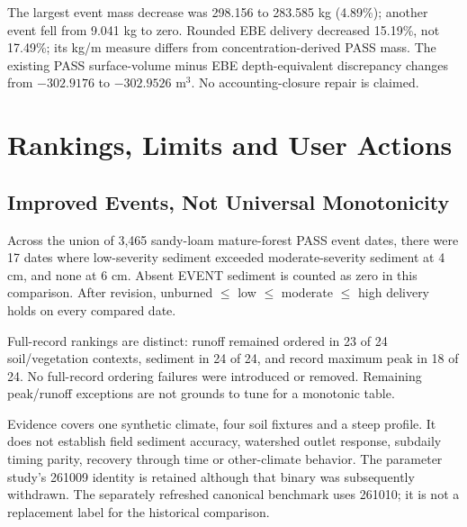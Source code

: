 The largest event mass decrease was 298.156 to 283.585 kg (4.89\%); another
event fell from 9.041 kg to zero. Rounded EBE delivery decreased 15.19\%, not
17.49\%; its kg/m measure differs from concentration-derived PASS mass.
The existing PASS surface-volume minus EBE depth-equivalent discrepancy changes
from $-302.9176$ to $-302.9526$ m$^3$. No accounting-closure repair is claimed.

\clearpage
\section{Rankings, Limits and User Actions}
\subsection{Improved Events, Not Universal Monotonicity}
Across the union of 3,465 sandy-loam mature-forest PASS event dates, there were
17 dates where low-severity sediment exceeded moderate-severity sediment at
4 cm, and none at 6 cm. Absent EVENT sediment is counted as zero in this
comparison. After revision, unburned $\leq$ low $\leq$ moderate $\leq$ high
delivery holds on every compared date.\cite{targeted}

Full-record rankings are distinct: runoff remained ordered in 23 of 24
soil/vegetation contexts, sediment in 24 of 24, and record maximum peak in
18 of 24. No full-record ordering failures were introduced or removed.
Remaining peak/runoff exceptions are not grounds to tune for a monotonic table.

Evidence covers one synthetic climate, four soil fixtures and a steep profile.
It does not establish field sediment accuracy, watershed outlet response,
subdaily timing parity, recovery through time or other-climate behavior.
The parameter study's 261009 identity is retained although that binary was
subsequently withdrawn. The separately refreshed canonical benchmark uses
261010; it is not a replacement label for the historical comparison.

